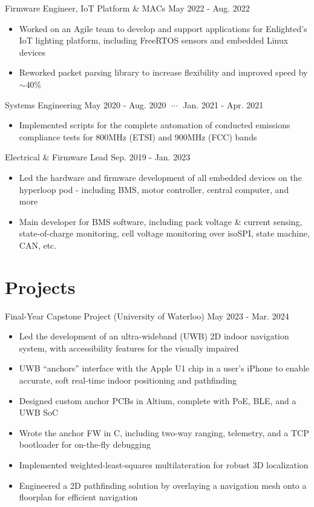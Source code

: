 \documentclass[lighthipster]{styles}
\begin{document}
\begin{paracol}{2}
{Firmware Engineer, IoT Platform \& MACs}
{May 2022 - Aug. 2022}
\begin{itemize}
    \item Worked on an Agile team to develop and support applications for Enlighted's
          IoT lighting platform, including FreeRTOS sensors and embedded Linux devices
    \item Reworked packet parsing library to increase flexibility and improved speed by $\sim$40\%
\end{itemize}

{Systems Engineering}
{May 2020 - Aug. 2020 $\;\cdots\;$ Jan. 2021 - Apr. 2021}
\begin{itemize}
    \item Implemented scripts for the complete automation of conducted emissions
          compliance tests for 800MHz (ETSI) and 900MHz (FCC) bands
\end{itemize}

{Electrical \& Firmware Lead}
{Sep. 2019 - Jan. 2023}
\begin{itemize}
    \item Led the hardware and firmware development of all embedded devices on the hyperloop
          pod - including BMS, motor controller, central computer, and more
    \item Main developer for BMS software, including pack voltage \& current sensing,
          state-of-charge monitoring, cell voltage monitoring over isoSPI, state machine, CAN, etc.
\end{itemize}

\section*{Projects}

{Final-Year Capstone Project (University of Waterloo)}
{May 2023 - Mar. 2024}
\begin{itemize}
    \item Led the development of an ultra-wideband (UWB) 2D indoor navigation system,
          with accessibility features for the visually impaired
    \item UWB “anchors” interface with the Apple U1 chip in a user's iPhone to enable
          accurate, soft real-time indoor positioning and pathfinding
    \item Designed custom anchor PCBs in Altium, complete with PoE, BLE, and a UWB SoC
    \item Wrote the anchor FW in C, including two-way ranging, telemetry, and a TCP
          bootloader for on-the-fly debugging
    \item Implemented weighted-least-squares multilateration for robust 3D localization 
    \item Engineered a 2D pathfinding solution by overlaying a navigation mesh onto a
          floorplan for efficient navigation
\end{itemize}



\end{paracol}
\end{document}

